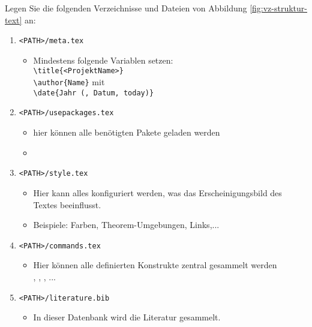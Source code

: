 	Legen Sie die folgenden Verzeichnisse und Dateien von Abbildung \ref{fig:vz-struktur-text} an:
	\begin{enumerate}
		\item \texttt{<PATH>/meta.tex}
		\begin{itemize}\small
			\item Mindestens folgende Variablen setzen: \\
			\hspace*{0.5cm}\texttt{\textbackslash title\{<ProjektName>\}}\\
			\hspace*{0.5cm}\texttt{\textbackslash author\{Name\}} mit \\
			\hspace*{0.5cm}\texttt{\textbackslash date\{Jahr (, Datum, today)\}}
		\end{itemize}
		\item \texttt{<PATH>/usepackages.tex}
		\begin{itemize}\small
			\item hier können alle benötigten Pakete geladen werden 
			\item[] ~~~~~
		\end{itemize}
		\item \texttt{<PATH>/style.tex}
		\begin{itemize}\small
			\item Hier kann alles konfiguriert werden, was das Erscheinigungsbild des Textes beeinflusst.
			\item Beispiele: Farben, Theorem-Umgebungen, Links,...
		\end{itemize}
		\item \texttt{<PATH>/commands.tex}
		\begin{itemize}\small
			\item Hier können alle definierten Konstrukte zentral gesammelt werden\\
			\hspace*{0.5cm} ,
			\hspace*{0.5cm} ,
			\hspace*{0.5cm} , ...
		\end{itemize}
		\item \texttt{<PATH>/literature.bib}
		\begin{itemize}\small
			\item In dieser Datenbank wird die Literatur gesammelt.

\end{itemize}
\end{enumerate}
